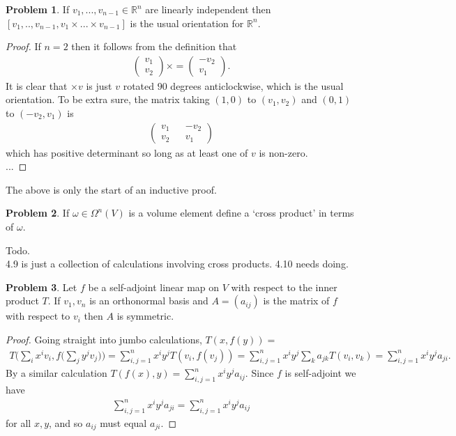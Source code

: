 \documentclass[20pt]{article}
\theoremstyle{plain}
\theoremstyle{definition}
\newtheorem*{problem}{Problem}
\newcommand{\reals}{\mathbb{R}}
\begin{document}
\begin{problem}{4.6}
  If $v_1, ..., v_{n-1} \in \reals^n$ are linearly independent then 
  $[v_1, .., v_{n-1}, v_1 \times ... \times v_{n-1}]$ is the usual 
  orientation for $\reals^n$.
\end{problem}
\begin{proof}
  If $n=2$ then it follows from the definition that 
  \begin{align*}
    \begin{pmatrix}
      v_1 \\ v_2
    \end{pmatrix}
    \times = 
    \begin{pmatrix}
      -v_2 \\ v_1
    \end{pmatrix}.
  \end{align*}
  It is clear that $\times v$ is just $v$ rotated $90$ degrees anticlockwise,
  which is the usual orientation.   To be extra sure, the matrix taking 
  $(1, 0)$ to $(v_1, v_2)$ and $(0, 1)$ to $(-v_2, v_1)$ is 
  \begin{align*}
    \begin{pmatrix}
      v_1 && -v_2 \\ v_2 && v_1
    \end{pmatrix}
  \end{align*}
  which has positive determinant so long as at least one of $v$ is non-zero. \\
  ...
\end{proof}
{\color{Blue}
The above is only the start of an inductive proof.}




\begin{problem}{4.8}
  If $\omega \in \Omega^n(V)$ is a volume element define a `cross product' in terms of $\omega$.
\end{problem}
{\color{Blue} Todo.\\
4.9 is just a collection of calculations involving cross products.
4.10 needs doing.}




\begin{problem}{4.11}
  Let $f$ be a self-adjoint linear map on $V$ with respect to the inner product
  $T$.  If $v_1, v_n$ is an orthonormal basis and $A = (a_{ij})$ is the matrix of 
  $f$ with respect to $v_i$ then $A$ is symmetric.
\end{problem}
\begin{proof}
  Going straight into jumbo calculations, $T(x, f(y)) = $
  \begin{align*}
    T \bigg( \sum_i x^iv_i, f \bigg( \sum_j y^jv_j  \bigg) \bigg) =
    \sum_{i,j = 1}^n x^iy^jT(v_i, f(v_j)) =
    \sum_{i,j = 1}^n x^iy^j \sum_k a_{jk} T(v_i, v_k) =
    \sum_{i,j = 1}^n x^iy^ja_{ji}.
  \end{align*}
  By a similar calculation $T(f(x), y) = \sum_{i,j = 1}^n x^iy^ja_{ij}$.
  Since $f$ is self-adjoint we have 
  \begin{align*}
    \sum_{i,j = 1}^n x^iy^ja_{ji} = \sum_{i,j = 1}^n x^iy^ja_{ij}
  \end{align*}
  for all $x, y$, and so $a_{ij}$ must equal $a_{ji}.$
\end{proof}
\end{document}
